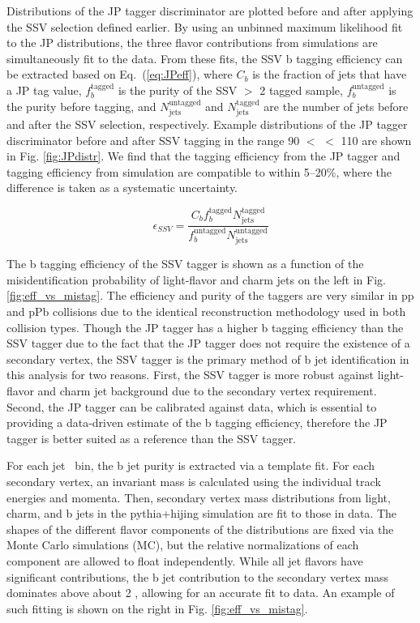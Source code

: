 Distributions of the JP tagger discriminator are plotted before and after applying the SSV selection defined earlier.  By using an unbinned maximum likelihood fit to the JP distributions, the three flavor contributions from simulations are simultaneously fit to the data.  From these fits, the SSV b tagging efficiency can be extracted based on Eq.~(\ref{eq:JPeff}), where $C_b$ is the fraction of jets that have a JP tag value, $f_b^{\mathrm{tagged}}$ is the purity of the SSV $>$ 2 tagged sample, $f_b^{\mathrm{untagged}}$ is the purity before tagging, and $N_{\mathrm{jets}}^{\mathrm{untagged}}$ and $N_{\mathrm{jets}}^{\mathrm{tagged}}$ are the number of jets before and after the SSV selection, respectively.  Example distributions of the JP tagger discriminator before and after SSV tagging in the range 90 $<$ \pt $<$ 110 \GeVc are shown in Fig. \ref{fig:JPdistr}.  We find that the tagging efficiency from the JP tagger and tagging efficiency from simulation are compatible to within 5--20\%, where the difference is taken as a systematic uncertainty.

\begin{equation}
\epsilon_{SSV} = \frac{C_{b}f_{b}^{\mathrm{tagged}}N_{\mathrm{jets}}^{\mathrm{tagged}}}{f_{b}^{\mathrm{untagged}}{N_{\mathrm{jets}}^{\mathrm{untagged}}}}
\label{eq:JPeff}
\end{equation}

The b tagging efficiency of the SSV tagger is shown as a function of the misidentification probability of light-flavor and charm jets on the left in Fig. \ref{fig:eff_vs_mistag}. The efficiency and purity of the taggers are very similar in pp and pPb collisions due to the identical reconstruction methodology used in both collision types.  Though the JP tagger has a higher b tagging efficiency than the SSV tagger due to the fact that the JP tagger does not require the existence of a secondary vertex, the SSV tagger is the primary method of b jet identification in this analysis for two reasons. First, the SSV tagger is more robust against light-flavor and charm jet background due to the secondary vertex requirement.  Second, the JP tagger can be calibrated against data, which is essential to providing a data-driven estimate of the b tagging efficiency, therefore the JP tagger is better suited as a reference than the SSV tagger.

For each jet \pt\ bin, the b jet purity is extracted via a template fit.  For each secondary vertex, an invariant mass is calculated using the individual track energies and momenta.  Then, secondary vertex mass distributions from light, charm, and b jets in the {\sc pythia+hijing} simulation are fit to those in data.  The shapes of the different flavor components of the distributions are fixed via the Monte Carlo simulations (MC), but the relative normalizations of each component are allowed to float independently.  While all jet flavors have significant contributions, the b jet contribution to the secondary vertex mass dominates above about 2 \GeVcc, allowing for an accurate fit to data.  An example of such fitting is shown on the right in Fig. \ref{fig:eff_vs_mistag}.

